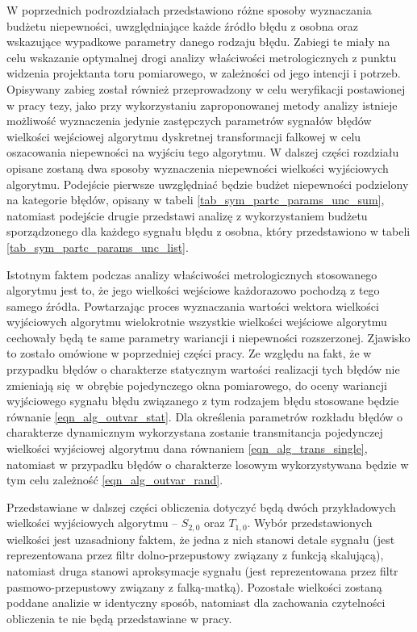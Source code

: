 W poprzednich podrozdziałach przedstawiono różne sposoby wyznaczania budżetu niepewności, uwzględniające każde źródło błędu z osobna oraz wskazujące wypadkowe parametry danego rodzaju błędu. Zabiegi te miały na celu wskazanie optymalnej drogi analizy właściwości metrologicznych z punktu widzenia projektanta toru pomiarowego, w zależności od jego intencji i potrzeb. Opisywany zabieg został również przeprowadzony w celu weryfikacji postawionej w pracy tezy, jako przy wykorzystaniu zaproponowanej metody analizy istnieje możliwość wyznaczenia jedynie zastępczych parametrów sygnałów błędów wielkości wejściowej algorytmu dyskretnej transformacji falkowej w celu oszacowania niepewności na wyjściu tego algorytmu. W dalszej części rozdziału opisane zostaną dwa sposoby wyznaczenia niepewności wielkości wyjściowych algorytmu. Podejście pierwsze uwzględniać będzie budżet niepewności podzielony na kategorie błędów, opisany w tabeli \ref{tab_sym_partc_params_unc_sum}, natomiast podejście drugie przedstawi analizę z wykorzystaniem budżetu sporządzonego dla każdego sygnału błędu z osobna, który przedstawiono w tabeli \ref{tab_sym_partc_params_unc_list}.

Istotnym faktem podczas analizy właściwości metrologicznych stosowanego algorytmu jest to, że jego wielkości wejściowe każdorazowo pochodzą z tego samego źródła. Powtarzając proces wyznaczania wartości wektora wielkości wyjściowych algorytmu wielokrotnie wszystkie wielkości wejściowe algorytmu cechowały będą te same parametry wariancji i niepewności rozszerzonej. Zjawisko to zostało omówione w poprzedniej części pracy. Ze względu na fakt, że w przypadku błędów o charakterze statycznym wartości realizacji tych błędów nie zmieniają się w obrębie pojedynczego okna pomiarowego, do oceny wariancji wyjściowego sygnału błędu związanego z tym rodzajem błędu stosowane będzie równanie \eqref{eqn_alg_outvar_stat}. Dla określenia parametrów rozkładu błędów o charakterze dynamicznym wykorzystana zostanie transmitancja pojedynczej wielkości wyjściowej algorytmu dana równaniem \eqref{eqn_alg_trans_single}, natomiast w przypadku błędów o charakterze losowym wykorzystywana będzie w tym celu zależność \eqref{eqn_alg_outvar_rand}.

Przedstawiane w dalszej części obliczenia dotyczyć będą dwóch przykładowych wielkości wyjściowych algorytmu -- $S_{2,0}$ oraz $T_{1,0}$. Wybór przedstawionych wielkości jest uzasadniony faktem, że jedna z nich stanowi detale sygnału (jest reprezentowana przez filtr dolno-przepustowy związany z funkcją skalującą), natomiast druga stanowi aproksymacje sygnału (jest reprezentowana przez filtr pasmowo-przepustowy związany z falką-matką). Pozostałe wielkości zostaną poddane analizie w identyczny sposób, natomiast dla zachowania czytelności obliczenia te nie będą przedstawiane w pracy.

